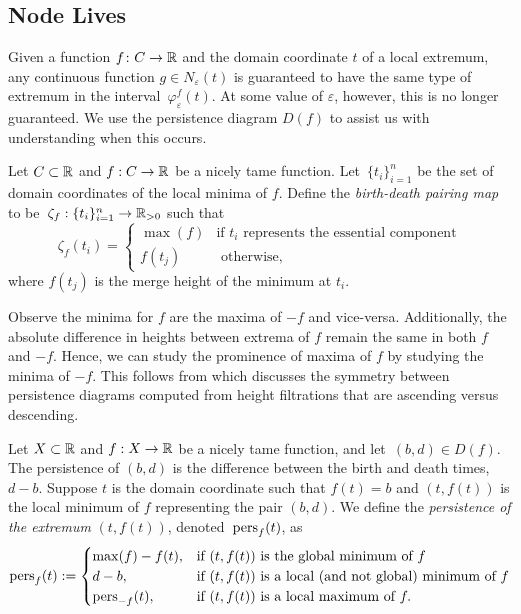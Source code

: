 \subsection{Node Lives}
\label{sec:node-lives}

Given a function $f \colon C \to \mathbb{R}$ and the domain coordinate $t$ of a local
extremum, any continuous function $g\in N_\varepsilon(t)$ is guaranteed to have 
the same type of extremum in the interval~$\varphi^f_{\varepsilon}(t)$. At some
value of $\varepsilon$, however, this is no longer guaranteed.
We use the persistence diagram $D(f)$ to assist us with understanding when this
occurs.

\begin{defn}
    Let $C \subset \mathbb{R}$ and $f:C\rightarrow \mathbb{R}$ be a nicely tame function.
    Let~$\{t_i\}_{i=1}^n$ be the
    set of domain coordinates of the local minima of $f$. Define the
    \emph{birth-death pairing map} to be~$\zeta_f: \{t_i\}_{i=1}^n \rightarrow \mathbb{R}_{>0}$ such that
    \[ \zeta_f(t_i) = \begin{cases}
        \max(f) & \text{if } t_i \text{ represents the essential component}\\
        f(t_j) & \text{ otherwise,}
    \end{cases}
    \]
    where $f(t_j)$ is the merge height of the minimum at $t_i$.
    \label{def:birth-death-map}
\end{defn}

Observe the minima for $f$ are the maxima of $-f$ and vice-versa. Additionally, the absolute difference in heights between extrema of $f$ remain the same in both $f$ and $-f$. Hence, we can study the prominence of maxima of $f$ by studying the minima of $-f$. This follows from \cite{BendichPersistent10} which discusses the symmetry between persistence diagrams computed from height filtrations that are ascending versus descending.

\begin{defn}
    Let $X \subset \mathbb{R}$ and $f:X\rightarrow \mathbb{R}$ be a nicely tame function, and
    let~$(b,d) \in D(f)$.  The persistence of $(b,d)$
    is the difference between the birth and death times,
    $d-b$. Suppose $t$ is the domain coordinate such that $f(t)=b$
    and $(t,f(t))$ is the local minimum of $f$ representing the pair $(b,d)$.
    We define the \emph{persistence of the extremum}  $(t,f(t))$,
    denoted~$\text{pers}_f(t)$, as
    \[ \text{pers}_f(t) :=
        \begin{cases}
            \max(f)-f(t), & \text{if } (t, f(t)) \text{ is the global minimum of } f\\
            d-b, & \text{if } (t, f(t)) \text{ is a local (and not global) minimum of } f\\
            \text{pers}_{-f}(t), & \text{if } (t, f(t)) \text{ is a local maximum of } f.\\
        \end{cases}
    \]
\end{defn}

